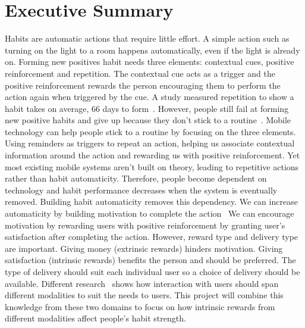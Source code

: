 \section*{Executive Summary}
Habits are automatic actions that require little effort. A simple action such as turning on the light to a room happens automatically, even if the light is already on.
Forming new positives habit needs three elements: contextual cues, positive
reinforcement and repetition.
The contextual cue acts as a trigger and the positive reinforcement rewards the
person encouraging them to perform the action again when triggered by the cue.
A study measured repetition to show a habit takes on average,
66 days to form~\cite{article_how_habits_formed_modelling_habit_formation}.
However, people still fail at forming new positive habits and give up because
they don't stick to a
routine~\cite{article_promoting_habit_formation, article_the_habitual_consumer}.\newline
\newline
Mobile technology can help people stick to a routine by focusing on the three elements.
Using reminders as triggers to repeat an action, helping us associate contextual
information around the action and rewarding us with positive reinforcement.
Yet most existing mobile systems aren't built on theory, leading to repetitive actions rather than habit automaticity.
Therefore, people become dependent on technology and habit performance decreases when the system is eventually removed.\newline
\newline
Building habit automaticity removes this dependency.
We can increase automaticity by building motivation to complete the action~\cite{article_a_self_efficacy, article_meta_analytic_review_intrinsic_motivation}
We can encourage motivation by rewarding users with positive reinforcement by granting user's satisfaction after completing the action.
However, reward type and delivery type are important. Giving money (extrinsic rewards) hinders motivation.
Giving satisfaction (intrinsic rewards) benefits the person and should be preferred.
The type of delivery should suit each individual user so a choice of delivery should be available.
Different research~\cite{article_user_centred_multimodal_reminders} shows how interaction with users should span different modalities to suit the needs to users.
This project will combine this knowledge from these two domains to focus on how intrinsic rewards from different modalities affect people's habit strength.\newline
